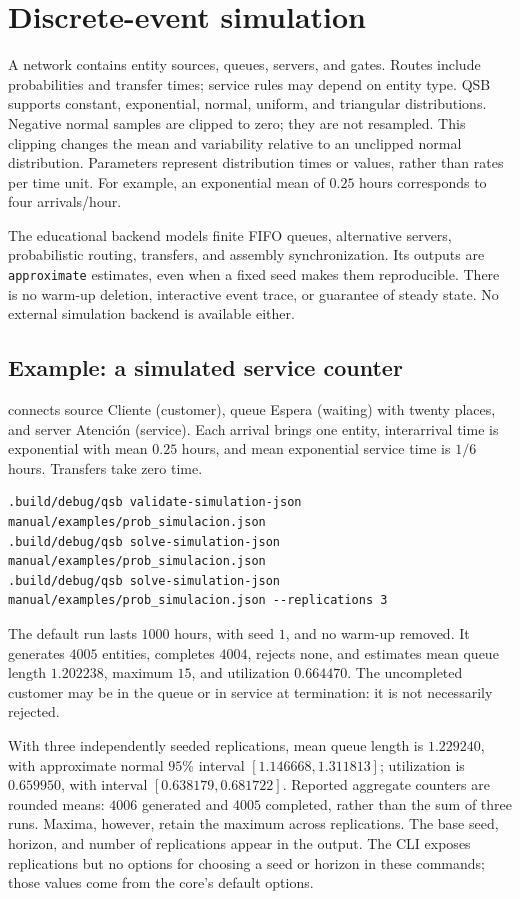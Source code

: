 \section{Discrete-event simulation}
A network contains entity sources, queues, servers, and gates. Routes include
probabilities and transfer times; service rules may depend on entity type.
QSB supports constant, exponential, normal, uniform, and triangular
distributions. Negative normal samples are clipped to zero; they are not
resampled. This clipping changes the mean and variability relative to an
unclipped normal distribution. Parameters represent distribution times or
values, rather than rates per time unit. For example, an exponential mean of
\(0.25\) hours corresponds to four arrivals/hour.

The educational backend models finite FIFO queues, alternative servers,
probabilistic routing, transfers, and assembly synchronization. Its outputs
are \texttt{approximate} estimates, even when a fixed seed makes them
reproducible. There is no warm-up deletion, interactive event trace, or
guarantee of steady state. No external simulation backend is available either.

\subsection{Example: a simulated service counter}
 connects source Cliente (customer), queue Espera
(waiting) with twenty places, and server Atención (service). Each arrival
brings one entity, interarrival time is exponential with mean \(0.25\)
hours, and mean exponential service time is \(1/6\) hours. Transfers take
zero time.
\begin{lstlisting}
.build/debug/qsb validate-simulation-json manual/examples/prob_simulacion.json
.build/debug/qsb solve-simulation-json manual/examples/prob_simulacion.json
.build/debug/qsb solve-simulation-json manual/examples/prob_simulacion.json --replications 3
\end{lstlisting}
The default run lasts \(1000\) hours, with seed \(1\), and no warm-up
removed. It generates \(4005\) entities, completes \(4004\), rejects
none, and estimates mean queue length \(1.202238\), maximum \(15\),
and utilization \(0.664470\). The uncompleted customer may be in the queue
or in service at termination: it is not necessarily rejected.

With three independently seeded replications, mean queue length is
\(1.229240\), with approximate normal \(95\%\) interval
\([1.146668,1.311813]\); utilization is \(0.659950\), with interval
\([0.638179,0.681722]\). Reported aggregate counters are rounded means:
\(4006\) generated and \(4005\) completed, rather than the sum of three
runs. Maxima, however, retain the maximum across replications. The base seed,
horizon, and number of replications appear in the output. The CLI exposes
replications but no options for choosing a seed or horizon in these commands;
those values come from the core's default options.

